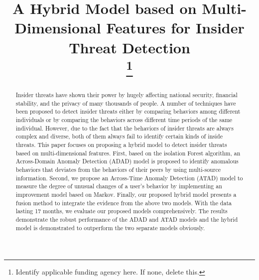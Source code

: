 \documentclass[conference]{IEEEtran}
\begin{document}
\title{A Hybrid Model based on Multi-Dimensional Features for Insider Threat Detection\\
\thanks{Identify applicable funding agency here. If none, delete this.}
}

\author{

}

\maketitle

\begin{abstract}
Insider threats have shown their power by hugely affecting national security, financial stability, and the privacy of many thousands of people.
A number of techniques have been proposed to detect insider threats either by comparing behaviors among different individuals or by comparing the behaviors across different time periods of the same individual. However, due to the fact that the behaviors of insider threats are always complex and diverse, both of them always fail to identify certain kinds of inside threats.
This paper focuses on proposing a hybrid model to detect insider threats based on multi-dimensional features.
First, based on the isolation Forest algorithm,  
an Across-Domain Anomaly Detection (ADAD) model is proposed to identify anomalous behaviors that deviates from the behaviors of their peers by using multi-source information. Second, we propose an Across-Time Anomaly Detection (ATAD) model to measure the degree of unusual changes of a user's behavior by implementing an improvement model based on Markov. Finally, our proposed hybrid model presents a fusion
method to integrate the evidence from the above two models. With the data lasting 17 months, we evaluate our proposed models comprehensively. The results demonstrate the robust performance of the ADAD and ATAD models and the hybrid model is demonstrated to outperform the two separate models obviously.


\end{abstract}
\end{document}
